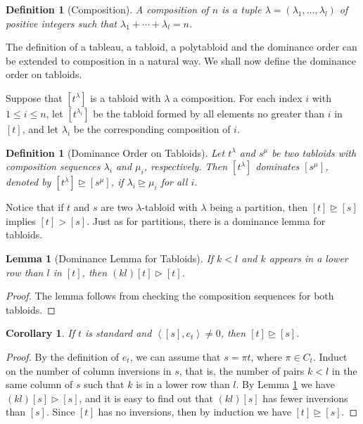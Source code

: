 \documentclass{assignment}[2019/10/15]
\newcommand{\lr}[3]{\left#1#3\right#2}
\theoremstyle{plain}
\newtheorem{definition}[theorem]{Definition}
\newtheorem{lemma}[theorem]{Lemma}
\newtheorem{corollary}[theorem]{Corollary}
\begin{document}
    \begin{definition}[Composition]
        A \emph{composition} of $n$ is a tuple $\lambda=(\lambda_1, \dotsc, \lambda_l)$ of positive integers such that $\lambda_1 + \dotsb + \lambda_l=n$.
    \end{definition}

    The definition of a tableau, a tabloid, a polytabloid and the dominance order can be extended to composition in a natural way. We shall now define the dominance order on tabloids.

    Suppose that $[t^\lambda]$ is a tabloid with $\lambda$ a composition. For each index $i$ with $1\leq i\leq n$, let $[t^{\lambda_i}]$ be the tabloid formed by all elements no greater than $i$ in $[t]$, and let $\lambda_i$ be the corresponding composition of $i$.

    \begin{definition}[Dominance Order on Tabloids]
        Let $t^\lambda$ and $s^\mu$ be two tabloids with composition sequences $\lambda_i$ and $\mu_i$, respectively. Then $[t^\lambda]$ dominates $[s^\mu]$, denoted by $[t^\lambda]\unrhd [s^\mu]$, if $\lambda_i\unrhd\mu_i$ for all $i$.
    \end{definition}

    Notice that if $t$ and $s$ are two $\lambda$-tabloid with $\lambda$ being a partition, then $[t]\unrhd [s]$ implies $[t]>[s]$. Just as for partitions, there is a dominance lemma for tabloids.

    \begin{lemma}[Dominance Lemma for Tabloids]\label{lem: dom-tab}
        If $k<l$ and $k$ appears in a lower row than $l$ in $[t]$, then $(k l)[t]\rhd[t]$.
    \end{lemma}

    \begin{proof}
        The lemma follows from checking the composition sequences for both tabloids.
    \end{proof}

    \begin{corollary}
        If $t$ is standard and $\lr<>{[s], e_t}\neq 0$, then $[t]\unrhd [s]$.
    \end{corollary}

    \begin{proof}
        By the definition of $e_t$, we can assume that $s=\pi t$, where $\pi\in C_t$. Induct on the number of column inversions in $s$, that is, the number of pairs $k<l$ in the same column of $s$ such that $k$ is in a lower row than $l$. By Lemma \ref{lem: dom-tab} we have $(k l)[s]\rhd[s]$, and it is easy to find out that $(k l)[s]$ has fewer inversions than $[s]$. Since $[t]$ has no inversions, then by induction we have $[t]\unrhd[s]$.
    \end{proof}
\end{document}
